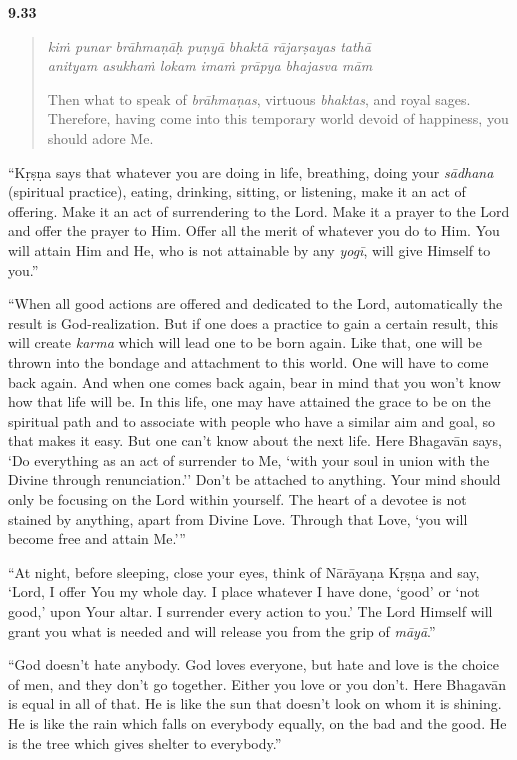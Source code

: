 \par\noindent\textbf{9.33}\par
\begin{verse}
\textit{kiṁ punar brāhmaṇāḥ puṇyā bhaktā rājarṣayas tathā} \\
\textit{anityam asukhaṁ lokam imaṁ prāpya bhajasva mām}

\noindent Then what to speak of \textit{brāhmaṇas}, virtuous \textit{bhaktas}, and royal sages. Therefore, having come into this temporary world devoid of happiness, you should adore Me.
\end{verse}
\par


\enquote{Kṛṣṇa says that whatever you are doing in life, breathing, doing your \textit{sādhana} (spiritual practice), eating, drinking, sitting, or listening, make it an act of offering. Make it an act of surrendering to the Lord. Make it a prayer to the Lord and offer the prayer to Him. Offer all the merit of whatever you do to Him. You will attain Him and He, who is not attainable by any \textit{yogī}, will give Himself to you.}

\enquote{When all good actions are offered and dedicated to the Lord, automatically the result is God-realization. But if one does a practice to gain a certain result, this will create \textit{karma} which will lead one to be born again. Like that, one will be thrown into the bondage and attachment to this world. One will have to come back again. And when one comes back again, bear in mind that you won’t know how that life will be. In this life, one may have attained the grace to be on the spiritual path and to associate with people who have a similar aim and goal, so that makes it easy. But one can’t know about the next life. Here Bhagavān says, \enquote{Do everything as an act of surrender to Me, ‘with your soul in union with the Divine through renunciation.’} Don’t be attached to anything. Your mind should only be focusing on the Lord within yourself. The heart of a devotee is not stained by anything, apart from Divine Love. Through that Love, \enquote{you will become free and attain Me.}}

\enquote{At night, before sleeping, close your eyes, think of Nārāyaṇa Kṛṣṇa and say, \enquote{Lord, I offer You my whole day. I place whatever I have done, ‘good’ or ‘not good,’ upon Your altar. I surrender every action to you.} The Lord Himself will grant you what is needed and will release you from the grip of \textit{māyā}.}

\enquote{God doesn’t hate anybody. God loves everyone, but hate and love is the choice of men, and they don’t go together. Either you love or you don’t. Here Bhagavān is equal in all of that. He is like the sun that doesn’t look on whom it is shining. He is like the rain which falls on everybody equally, on the bad and the good. He is the tree which gives shelter to everybody.}

